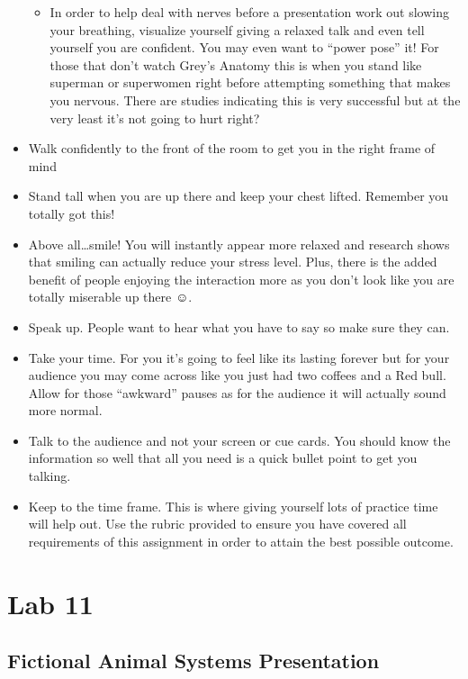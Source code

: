 \documentclass[
]{book}
\providecommand{\tightlist}{%
  \setlength{\itemsep}{0pt}\setlength{\parskip}{0pt}}
\begin{document}
\begin{itemize}
  \begin{itemize}
  \tightlist
  \item
    In order to help deal with nerves before a presentation work out slowing your breathing, visualize yourself giving a relaxed talk and even tell yourself you are confident. You may even want to ``power pose'' it! For those that don't watch
    Grey's Anatomy this is when you stand like superman or superwomen right before attempting something that makes you nervous. There are studies indicating this is very successful but at the very least it's not going to hurt right?
  \end{itemize}
\item
  Walk confidently to the front of the room to get you in the right frame of mind
\item
  Stand tall when you are up there and keep your chest lifted. Remember you totally got this!
\item
  Above all\ldots smile! You will instantly appear more relaxed and research shows that smiling can actually reduce your stress level. Plus, there is the added benefit of people enjoying the interaction more as you don't look like you are totally miserable up there ☺.
\item
  Speak up. People want to hear what you have to say so make sure they can.
\item
  Take your time. For you it's going to feel like its lasting forever but for your audience you may come across like you just had two coffees and a Red bull. Allow for those ``awkward'' pauses as for the audience it will actually sound more normal.
\item
  Talk to the audience and not your screen or cue cards. You should know the information so well that all you need is a quick bullet point to get you talking.
\item
  Keep to the time frame. This is where giving yourself lots of practice time will help out.
  Use the rubric provided to ensure you have covered all requirements of this assignment in order to attain the best possible outcome.
\end{itemize}

\hypertarget{part-lab-11}{%
\part*{Lab 11}\label{part-lab-11}}

\hypertarget{fictional-animal-systems-presentation}{%
\chapter*{Fictional Animal Systems Presentation}\label{fictional-animal-systems-presentation}}
\end{document}

